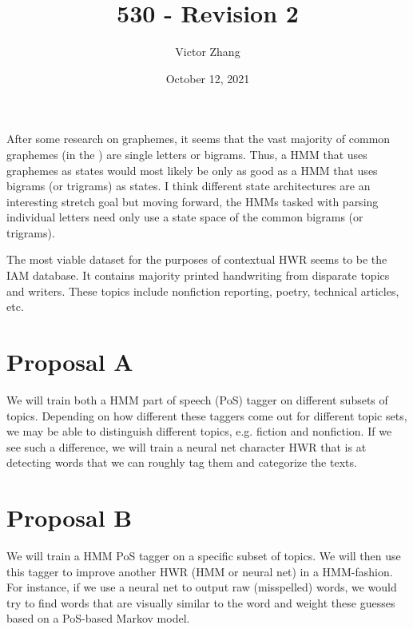 \documentclass{article}
\title{530 - Revision 2}
\author{Victor Zhang}
\date{October 12, 2021}
\begin{document}
\maketitle


After some research on graphemes, it seems that the vast majority of common graphemes (in the ) are single letters or bigrams. Thus, a HMM that uses graphemes as states would most likely be only as good as a HMM that uses bigrams (or trigrams) as states. I think different state architectures are an interesting stretch goal but moving forward, the HMMs tasked with parsing individual letters need only use a state space of the common bigrams (or trigrams).

The most viable dataset for the purposes of contextual HWR seems to be the IAM database. It contains majority printed handwriting from disparate topics and writers. These topics include nonfiction reporting, poetry, technical articles, etc.

\section{Proposal A}
We will train both a HMM part of speech (PoS) tagger on different subsets of topics. Depending on how different these taggers come out for different topic sets, we may be able to distinguish different topics, e.g. fiction and nonfiction. If we see such a difference, we will train a neural net character HWR that is  at detecting words that we can roughly tag them and categorize the texts.

\section{Proposal B}
We will train a HMM PoS tagger on a specific subset of topics. We will then use this tagger to improve another HWR (HMM or neural net) in a HMM-fashion. For instance, if we use a neural net to output raw (misspelled) words, we would try to find words that are visually similar to the word and weight these guesses based on a PoS-based Markov model.
\end{document}
